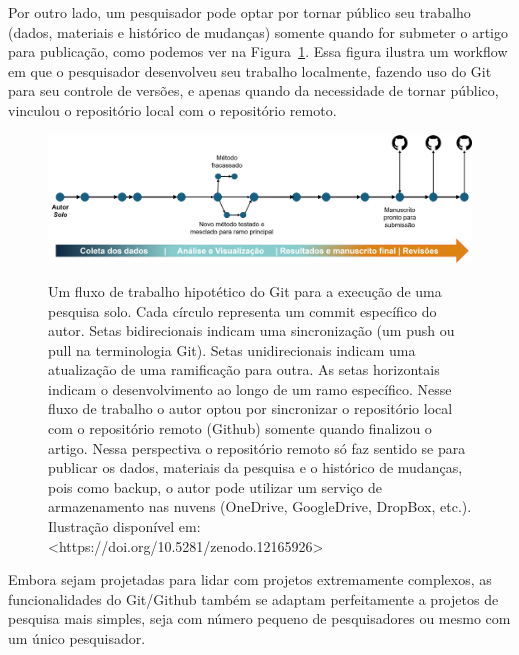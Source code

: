\documentclass[
  a4paper,
]{article}
\begin{document}
Por outro lado, um pesquisador pode optar por tornar público seu
trabalho (dados, materiais e histórico de mudanças) somente quando for
submeter o artigo para publicação, como podemos ver na
Figura~\ref{fig-gitautorend}. Essa figura ilustra um workflow em que o
pesquisador desenvolveu seu trabalho localmente, fazendo uso do Git para
seu controle de versões, e apenas quando da necessidade de tornar
público, vinculou o repositório local com o repositório remoto.

\begin{figure}

\href{https://doi.org/10.5281/zenodo.12165926}{\includegraphics{img/gitautorend.jpg}}

\caption{\label{fig-gitautorend}Um fluxo de trabalho hipotético do Git
para a execução de uma pesquisa solo. Cada círculo representa um commit
específico do autor. Setas bidirecionais indicam uma sincronização (um
push ou pull na terminologia Git). Setas unidirecionais indicam uma
atualização de uma ramificação para outra. As setas horizontais indicam
o desenvolvimento ao longo de um ramo específico. Nesse fluxo de
trabalho o autor optou por sincronizar o repositório local com o
repositório remoto (Github) somente quando finalizou o artigo. Nessa
perspectiva o repositório remoto só faz sentido se para publicar os
dados, materiais da pesquisa e o histórico de mudanças, pois como
backup, o autor pode utilizar um serviço de armazenamento nas nuvens
(OneDrive, GoogleDrive, DropBox, etc.). Ilustração disponível em:
\textless https://doi.org/10.5281/zenodo.12165926\textgreater{}}

\end{figure}%

Embora sejam projetadas para lidar com projetos extremamente complexos,
as funcionalidades do Git/Github também se adaptam perfeitamente a
projetos de pesquisa mais simples, seja com número pequeno de
pesquisadores ou mesmo com um único pesquisador.
\end{document}
